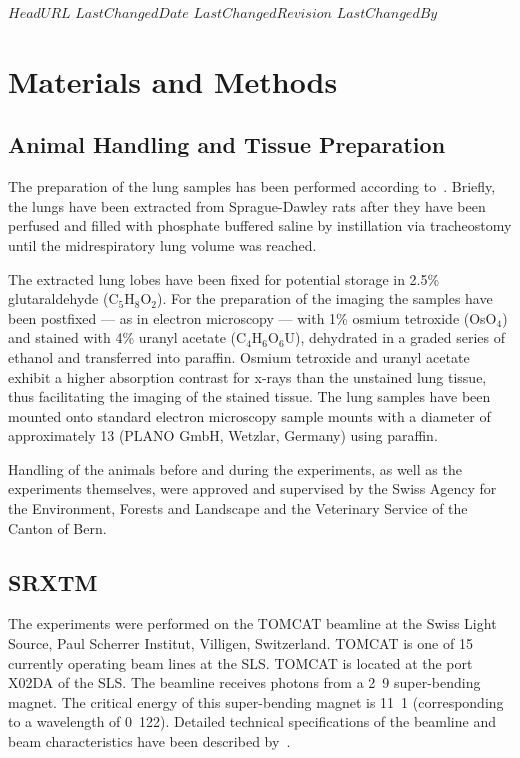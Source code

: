 \svnidlong
{$HeadURL$}
{$LastChangedDate$}
{$LastChangedRevision$}
{$LastChangedBy$}
\section{Materials and Methods}
\label{sec:materials and methods}
\subsection{Animal Handling and Tissue Preparation}
The preparation of the lung samples has been performed according to~\citet{Schittny1997,Schittny1998}. Briefly, the lungs have been extracted from Sprague-Dawley rats after they have been perfused and filled with phosphate buffered saline by instillation via tracheostomy until the midrespiratory lung volume was reached.

The extracted lung lobes have been fixed for potential storage in 2.5\% glutaraldehyde (C$_5$H$_8$O$_2$). For the preparation of the imaging the samples have been postfixed --- as in electron microscopy --- with 1\% osmium tetroxide (OsO$_4$) and stained with 4\% uranyl acetate (C$_4$H$_6$O$_6$U), dehydrated in a graded series of ethanol and transferred into paraffin. Osmium tetroxide and uranyl acetate exhibit a higher absorption contrast for x-rays than the unstained lung tissue, thus facilitating the imaging of the stained tissue. The lung samples have been mounted onto standard electron microscopy sample mounts with a diameter of approximately \unit{13}{\milli\meter} (PLANO GmbH, Wetzlar, Germany) using paraffin.

Handling of the animals before and during the experiments, as well as the experiments themselves, were approved and supervised by the Swiss Agency for the Environment, Forests and Landscape and the Veterinary Service of the Canton of Bern.

\subsection{SRXTM}
The experiments were performed on the TOMCAT beamline at the Swiss Light Source, Paul Scherrer Institut, Villigen, Switzerland. TOMCAT is one of 15 currently operating beam lines at the SLS. TOMCAT is located at the port X02DA of the SLS. The beamline receives photons from a \unit{2.9}{\tesla} super-bending magnet. The critical energy of this super-bending magnet is \unit{11.1}{\kilo\electronvolt} (corresponding to a wavelength of \unit{0.122}{\nano\meter}). Detailed technical specifications of the beamline and beam characteristics have been described by~\citet{Stampanoni2006a,Stampanoni2007}.

